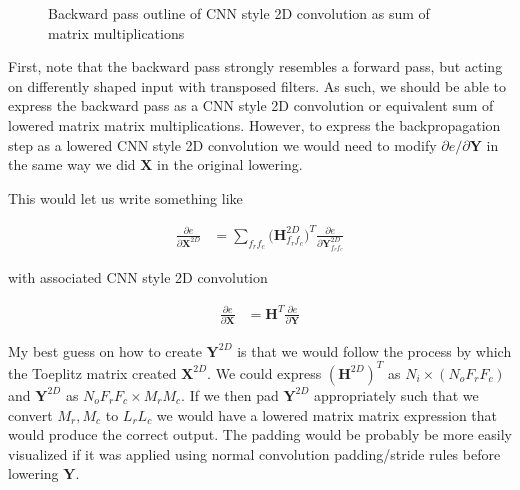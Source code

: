 \documentclass[11pt]{article}
\newcommand{\pd}{\partial}
\newcommand{\bs}{\boldsymbol}
\begin{document}
\begin{solution}
\begin{figure}[H]
	\caption{Backward pass outline of CNN style 2D convolution as sum of matrix
		multiplications}
	\end{figure}

	First, note that the backward pass strongly resembles a
	forward pass, but acting on differently shaped input with transposed
	filters. As such, we should be able to express the backward pass as a CNN
	style 2D convolution or equivalent sum of lowered matrix matrix
	multiplications. However, to express the backpropagation step as a lowered
	CNN style 2D convolution we would need to modify $\pd e / \pd\bs{Y}$ in the
	same way we did $\bs{X}$ in the original lowering.
	\newline

	This would let us write something like

	\begin{align}
		\frac{\pd e}{\pd\bs{X}^{2D}}
		&=
		\sum_{f_rf_c}\bigg(\bs{H}_{f_rf_c}^{2D}\bigg)^T
		\frac{\pd e}{\pd \bs{Y}_{f_rf_c}^{2D}}
	\end{align}

	with associated CNN style 2D convolution

	\begin{align}
		\frac{\pd e}{\pd\bs{X}}
		&=
		\bs{H}^T
		\frac{\pd e}{\pd \bs{Y}}
	\end{align}

	My best guess on how to create $\bs{Y}^{2D}$ is that we would
	follow the process by which the Toeplitz matrix created $\bs{X}^{2D}$.
	We could express $(\bs{H}^{2D})^T$ as $N_i \times (N_o F_r F_c)$ and
	$\bs{Y}^{2D}$ as $N_o F_r F_c \times M_r M_c$. If we then pad $\bs{Y}^{2D}$
	appropriately such that we convert $M_r, M_c$ to $L_r L_c$ we would have a
	lowered matrix matrix expression that would produce the correct output. The
	padding would be probably be more easily visualized if it was applied using
	normal convolution padding/stride rules before lowering $\bs{Y}$.



\end{solution}
\end{document}
